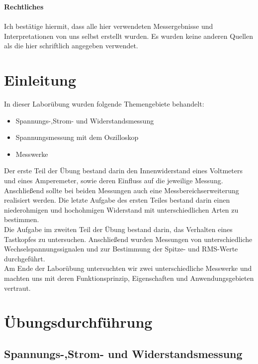 \documentclass[a4paper,12pt]{article}
\begin{document}
	
	
	\noindent
	\textbf{\Large Rechtliches} \\ \\
	Ich bestätige hiermit, dass alle hier verwendeten Messergebnisse und Interpretationen von uns selbst erstellt wurden. Es wurden keine anderen Quellen als die hier schriftlich angegeben verwendet.
	\setcounter{page}{2}
	
	\newpage
	\tableofcontents
	
	\newpage
	\section{Einleitung}
	In dieser Laborübung wurden folgende Themengebiete behandelt:
	\begin{itemize}
		\item Spannungs-,Strom- und Widerstandsmessung
		\item Spannungsmessung mit dem Oszilloskop
		\item Messwerke 
	\end{itemize}
	Der erste Teil der Übung bestand darin den Innenwiderstand eines Voltmeters und eines Amperemeter, sowie deren Einfluss auf die jeweilige Messung. Anschließend sollte bei beiden Messungen auch eine Messbereichserweiterung realisiert werden. Die letzte Aufgabe des ersten Teiles bestand darin einen niederohmigen und hochohmigen Widerstand mit unterschiedlichen Arten zu bestimmen. \\
	Die Aufgabe im zweiten Teil der Übung bestand darin, das Verhalten eines Tastkopfes zu untersuchen. Anschließend wurden Messungen von unterschiedliche Wechselspannungssignalen und zur Bestimmung der Spitze- und RMS-Werte durchgeführt. \\
	Am Ende der Laborübung untersuchten wir zwei unterschiedliche Messwerke und machten uns mit deren Funktionsprinzip, Eigenschaften und Anwendungsgebieten vertraut.

	\newpage
	\section{Übungsdurchführung}
	\subsection{Spannungs-,Strom- und Widerstandsmessung}
\end{document}
